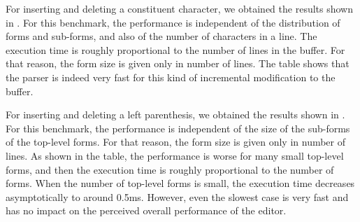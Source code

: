 For inserting and deleting a constituent character, we obtained the
results shown in .  For this benchmark, the
performance is independent of the distribution of forms and sub-forms,
and also of the number of characters in a line.  The execution time is
roughly proportional to the number of lines in the buffer.  For that
reason, the form size is given only in number of lines.
The table shows that the parser is indeed very fast for this kind of
incremental modification to the buffer.

\begin{table}[htb]
\end{table}

For inserting and deleting a left parenthesis, we obtained the results
shown in .  For this benchmark,
the performance is independent of the size of the sub-forms of the
top-level forms.  For that reason, the form size is given only in
number of lines.  As shown in the table, the performance is worse for
many small top-level forms, and then the execution time is roughly
proportional to the number of forms.  When the number of top-level
forms is small, the execution time decreases asymptotically to around
0.5ms.  However, even the slowest case is very fast and has no impact
on the perceived overall performance of the editor.

\begin{table}[htb]
\end{table}

